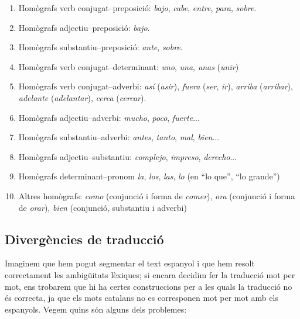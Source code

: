 \begin{enumerate}
\item Homògrafs verb conjugat--preposició: \emph{bajo}, {\em
    cabe}, \emph{entre}, \emph{para}, \emph{sobre}.

\item Homògrafs adjectiu--preposició: \emph{bajo}.

\item Homògrafs substantiu--preposició: \emph{ante}, \emph{sobre}.

\item Homògrafs verb conjugat--determinant:  \emph{uno}, \emph{una},
  \emph{unas} (\emph{unir})
    
\item Homògrafs verb conjugat--adverbi: \emph{así} (\emph{asir}),
    \emph{fuera} (\emph{ser}, \emph{ir}), \emph{ arriba} (\emph{arribar}), {\em
      adelante} (\emph{adelantar}), \emph{cerca} (\emph{cercar}).

\item Homògrafs adjectiu--adverbi: \emph{mucho}, \emph{poco}, {\em
    fuerte}...

\item Homògrafs substantiu--adverbi: \emph{antes}, \emph{tanto},
  \emph{mal}, \emph{bien}...

\item Homògrafs adjectiu--substantiu: \emph{complejo}, {\em
    impreso}, \emph{derecho}...

\item Homògrafs determinant--pronom
    \emph{la}, \emph{los}, \emph{las}, \emph{lo} (en ``lo que'', ``lo grande'')

\item Altres homògrafs: \emph{como} (conjunció i forma de \emph{comer}), \emph{ora} 
  (conjunció i forma de \emph{orar}), \emph{bien} (conjunció, substantiu i
adverbi)

\end{enumerate}


\subsection{Divergències de traducció}

Imaginem que hem pogut segmentar el text espanyol i que hem resolt 
correctament les ambigüitats
lèxiques; si encara decidim fer la traducció mot per mot, ens
trobarem que hi ha certes construccions per a les quals la
traducció no és correcta, ja que els mots catalans no es
corresponen mot per mot amb els espanyols. Vegem quins són 
alguns dels problemes:

